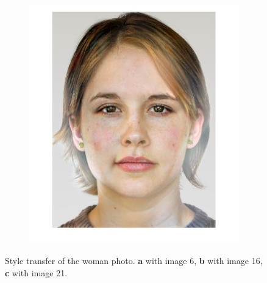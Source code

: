 \documentclass[a4paper]{iacas}
\begin{document}
\begin{figure}[!htbp]
\begin{subfigure}[b]{0.32\textwidth}
		\caption{}
		\label{fig:i_46_16}
	\end{subfigure}
	\begin{subfigure}[b]{0.32\textwidth}
		\includegraphics[width=\textwidth]{image_46_21.jpg}
		\caption{}
		\label{fig:i_46_21}
	\end{subfigure}
	
	\caption{Style transfer of the woman photo. \textbf{a} with image 6, \textbf{b} with image 16, \textbf{c} with image 21.}
	\label{fig:Woman}
\end{figure}
\end{document}
